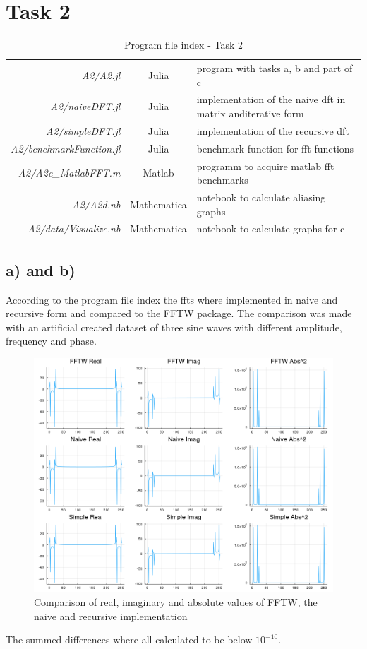\documentclass[12pt,a4paper]{article}
\begin{document}
\section*{Task 2}
	\begin{table}[H]
		\caption{Program file index - Task 2}
		\begin{tabular}{r|c|p{10cm}}
			\textit{A2/A2.jl} & Julia & program with tasks a, b and part of c \\
			\textit{A2/naiveDFT.jl} & Julia & implementation of the naive dft in matrix and\newline iterative form \\
			\textit{A2/simpleDFT.jl} & Julia & implementation of the recursive dft \\
			\textit{A2/benchmarkFunction.jl} & Julia & benchmark function for fft-functions \\
			
			\textit{A2/A2c\_MatlabFFT.m} & Matlab & programm to acquire matlab fft benchmarks \\
			\textit{A2/A2d.nb} & Mathematica & notebook to calculate aliasing graphs \\
			\textit{A2/data/Visualize.nb} & Mathematica & notebook to calculate graphs for c
		\end{tabular}
	\end{table}
	\subsection*{a) and b)}
		According to the program file index the ffts where implemented in naive and recursive
		form and compared to the FFTW package. The comparison was made with an artificial created
		dataset of three sine waves with different amplitude, frequency and phase.
		\begin{figure}[H]
			\centering
			\includegraphics[width=\textwidth]{A2/data/fftPlot.png}
			\caption[]{Comparison of real, imaginary and absolute values of FFTW, the naive and recursive implementation}
		\end{figure}
		The summed differences where all calculated to be below \(10^{-10}\).
	
\end{document}
